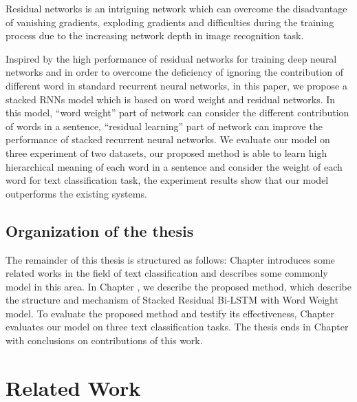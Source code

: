 \documentclass[senior]{IPSstyle}
\begin{document}
Residual networks\cite{he2015deep} is an intriguing network which can overcome the disadvantage of vanishing gradients, exploding gradients and difficulties during the training process due to the increasing network depth in image recognition task.

Inspired by the high performance of residual networks for training deep neural networks and in order to overcome the deficiency of ignoring the contribution of different word in standard recurrent neural networks, in this paper, we propose a stacked RNNs model which is based on word weight and residual networks. In this model, “word weight” part of network can consider the different contribution of words in a sentence, “residual learning” part of network can improve the performance of stacked recurrent neural networks. We evaluate our model on three experiment of two datasets, our proposed method is able to learn high hierarchical meaning of each word in a sentence and consider the weight of each word for text classification task, the experiment results show that our model outperforms the existing systems.




\section{Organization of the thesis}
The remainder of this thesis is structured as follows: Chapter \uppercase\expandafter{}  introduces some related works in the field of text classification and describes some commonly model in this area. In Chapter \uppercase\expandafter{}, we describe the proposed method, which describe the structure and mechanism of Stacked Residual Bi-LSTM with Word Weight model. To evaluate the proposed method and testify its effectiveness, Chapter \uppercase\expandafter{} evaluates our model on three text classification tasks. The thesis ends in Chapter \uppercase\expandafter{} with conclusions on contributions of this work.

\chapter{Related Work} \label{ch3}
\end{document}
